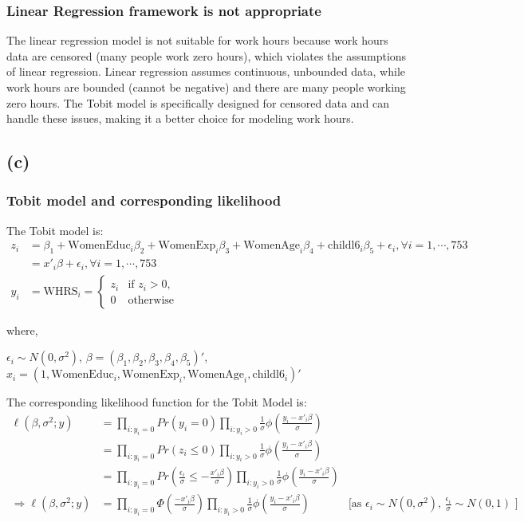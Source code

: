 \documentclass[a4paper]{article}
\begin{document}
\subsubsection*{Linear Regression framework is not appropriate }
The linear regression model is not suitable for work hours because work hours data are censored (many people work zero hours), which violates the assumptions of linear regression. Linear regression assumes continuous, unbounded data, while work hours are bounded (cannot be negative) and there are many people working zero hours. The Tobit model is specifically designed for censored data and can handle these issues, making it a better choice for modeling work hours.


\subsection*{(c)}

\subsubsection*{Tobit model and corresponding likelihood}

The Tobit model is:
\begin{align*}
    z_{i} &= \beta_{1} + \text{WomenEduc}_{i}\beta_{2} + \text{WomenExp}_{i}\beta_{3} + \text{WomenAge}_{i}\beta_{4} + \text{childl6}_{i}\beta_{5} + \epsilon_{i}, \forall i = 1, \cdots, 753  \\
    &= x'_{i} \beta + \epsilon_{i}, \forall i = 1, \cdots, 753 \\
    y_{i} &= \text{WHRS}_{i} =
\begin{cases} 
z_{i} & \text{if } z_{i} > 0, \\
0 & \text{otherwise}
\end{cases}
\end{align*}

where, 

$\epsilon_{i} \sim N(0, \sigma^2)$, $\beta = (\beta_{1}, \beta_{2},\beta_{3},\beta_{4},\beta_{5})'$,
$x_{i} = (1,\text{WomenEduc}_{i},\text{WomenExp}_{i}, \text{WomenAge}_{i}, \text{childl6}_i)'$
\vspace{4pt}

The corresponding likelihood function for the Tobit Model is:
\begin{align*}
    \ell(\beta, \sigma^2 ;y) &= \prod_{i : y_i = 0} Pr(y_i = 0) \prod_{i : y_i > 0} \frac{1}{\sigma}\phi(\frac{y_i - x'_i\beta}{\sigma}) \\
    &= \prod_{i : y_i = 0} Pr(z_i \leq 0) \prod_{i : y_i > 0} \frac{1}{\sigma} \phi(\frac{y_i - x'_i\beta}{\sigma}) \\
    &= \prod_{i : y_i = 0} Pr(\frac{\epsilon_i}{\sigma} \leq -\frac{x'_i\beta}{\sigma}) \prod_{i : y_i > 0} \frac{1}{\sigma} \phi(\frac{y_i - x'_i\beta}{\sigma}) \\
    \Rightarrow \ell(\beta, \sigma^2 ;y) &= \prod_{i : y_i = 0} \Phi (\frac{-x'_i\beta}{\sigma}) \prod_{i : y_i > 0} \frac{1}{\sigma} \phi(\frac{y_i - x'_i\beta}{\sigma}) & \text{[as $\epsilon_i \sim  N(0,\sigma^2)$, $\frac{\epsilon_i}{\sigma} \sim N(0,1)$ ]}
\end{align*}
\end{document}
